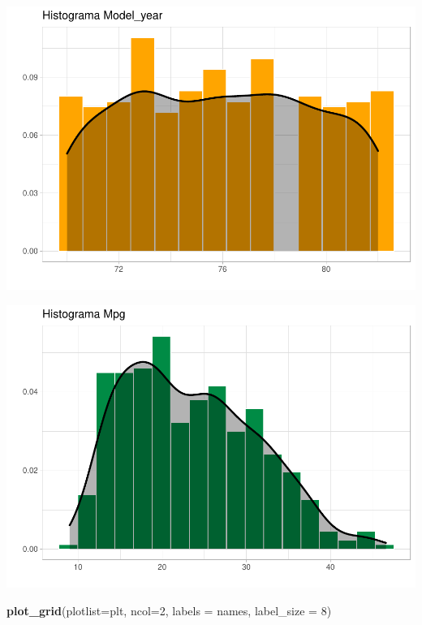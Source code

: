 \documentclass[
]{article}
\newenvironment{Shaded}{\begin{snugshade}}{\end{snugshade}}
\newcommand{\DataTypeTok}[1]{\textcolor[rgb]{0.13,0.29,0.53}{#1}}
\newcommand{\DecValTok}[1]{\textcolor[rgb]{0.00,0.00,0.81}{#1}}
\newcommand{\KeywordTok}[1]{\textcolor[rgb]{0.13,0.29,0.53}{\textbf{#1}}}
\newcommand{\NormalTok}[1]{#1}
\begin{document}
\begin{center}\includegraphics{EDA_files/figure-latex/unnamed-chunk-7-5} \end{center}

\begin{center}\includegraphics{EDA_files/figure-latex/unnamed-chunk-7-6} \end{center}

\begin{Shaded}
\begin{Highlighting}[]
\KeywordTok{plot_grid}\NormalTok{(}\DataTypeTok{plotlist=}\NormalTok{plt, }\DataTypeTok{ncol=}\DecValTok{2}\NormalTok{, }\DataTypeTok{labels =}\NormalTok{ names, }\DataTypeTok{label_size =} \DecValTok{8}\NormalTok{)}
\end{Highlighting}
\end{Shaded}
\end{document}
